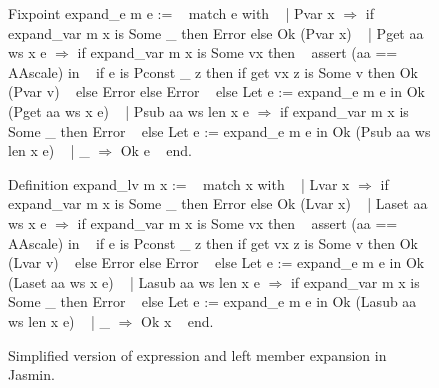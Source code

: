 \documentclass{article}
\begin{document}
\begin{figure}[t]
\obeylines\obeyspaces\ttfamily%
Fixpoint expand\_e m e := 
~ match e with
~ | Pvar x \(\Rightarrow\) if expand\_var m x is Some \_ then Error else Ok (Pvar x)
~ | Pget aa ws x e \(\Rightarrow\) if expand\_var m x is Some vx then
~     assert (aa == AAscale) in
~     if e is Pconst \_ z then if get vx z is Some v then Ok (Pvar v)
~     else Error else Error
~   else Let e := expand\_e m e in Ok (Pget aa ws x e)
~ | Psub aa ws len x e \(\Rightarrow\) if expand\_var m x is Some \_ then Error
~   else Let e := expand\_e m e in Ok (Psub aa ws len x e)
~ | \_ \(\Rightarrow\) Ok e
~ end.

Definition expand\_lv m x :=
~ match x with
~ | Lvar x \(\Rightarrow\) if expand\_var m x is Some \_ then Error else Ok (Lvar x)
~ | Laset aa ws x e \(\Rightarrow\) if expand\_var m x is Some vx then
~     assert (aa == AAscale) in
~     if e is Pconst \_ z then if get vx z is Some v then Ok (Lvar v)
~     else Error else Error
~   else Let e := expand\_e m e in Ok (Laset aa ws x e)
~ | Lasub aa ws len x e \(\Rightarrow\) if expand\_var m x is Some \_ then Error
~   else Let e := expand\_e m e in Ok (Lasub aa ws len x e)
~ | \_ \(\Rightarrow\) Ok x
~ end.
\normalfont%
\caption{Simplified version of expression and left member expansion in Jasmin.}
\end{figure}
\end{document}
